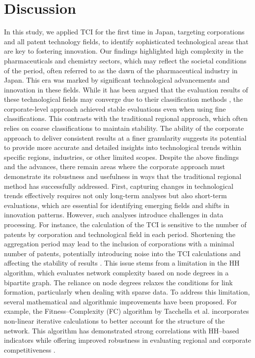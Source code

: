 \documentclass[fleqn,10pt]{wlscirep}
\begin{document}
\section*{Discussion} \label{section:Discussion}

In this study, we applied TCI for the first time in Japan, targeting corporations and all patent technology fields, to identify sophisticated technological areas that are key to fostering innovation. Our findings highlighted high complexity in the pharmaceuticals and chemistry sectors, which may reflect the societal conditions of the period, often referred to as the dawn of the pharmaceutical industry in Japan. This era was marked by significant technological advancements and innovation in these fields.
While it has been argued that the evaluation results of these technological fields may converge due to their classification methods \cite{Hidalgo2021}, the corporate-level approach achieved stable evaluations even when using fine classifications. This contrasts with the traditional regional approach, which often relies on coarse classifications to maintain stability. The ability of the corporate approach to deliver consistent results at a finer granularity suggests its potential to provide more accurate and detailed insights into technological trends within specific regions, industries, or other limited scopes.
Despite the above findings and the advances, there remain areas where the corporate approach must demonstrate its robustness and usefulness in ways that the traditional regional method has successfully addressed. 
First, capturing changes in technological trends effectively requires not only long-term analyses but also short-term evaluations, which are essential for identifying emerging fields and shifts in innovation patterns. However, such analyses introduce challenges in data processing. For instance, the calculation of the TCI is sensitive to the number of patents by corporation and technological field in each period. Shortening the aggregation period may lead to the inclusion of corporations with a minimal number of patents, potentially introducing noise into the TCI calculations and affecting the stability of results \cite{PintarEssletzbichler2022}.
This issue stems from a limitation in the HH algorithm, which evaluates network complexity based on node degrees in a bipartite graph. The reliance on node degrees relaxes the conditions for link formation, particularly when dealing with sparse data. To address this limitation, several mathematical and algorithmic improvements have been proposed. For example, the Fitness--Complexity (FC) algorithm by Tacchella et al. \cite{Tacchella2012} incorporates non-linear iterative calculations to better account for the structure of the network. This algorithm has demonstrated strong correlations with HH--based indicators while offering improved robustness in evaluating regional and corporate competitiveness \cite{Wu2016,Albeaik2017}.
\end{document}
